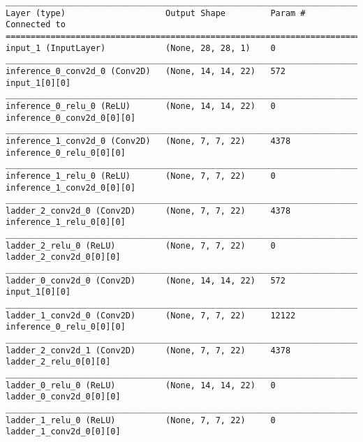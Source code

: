 \begin{lstlisting}[caption={\ac{VLAE} network encoder used for network sparsity experiments with one third the number of feature maps},captionpos=b,basicstyle=\tiny, label={lst:sparsity-vlae-encoder-28-fm3}]
__________________________________________________________________________________________________
Layer (type)                    Output Shape         Param #     Connected to
==================================================================================================
input_1 (InputLayer)            (None, 28, 28, 1)    0
__________________________________________________________________________________________________
inference_0_conv2d_0 (Conv2D)   (None, 14, 14, 22)   572         input_1[0][0]
__________________________________________________________________________________________________
inference_0_relu_0 (ReLU)       (None, 14, 14, 22)   0           inference_0_conv2d_0[0][0]
__________________________________________________________________________________________________
inference_1_conv2d_0 (Conv2D)   (None, 7, 7, 22)     4378        inference_0_relu_0[0][0]
__________________________________________________________________________________________________
inference_1_relu_0 (ReLU)       (None, 7, 7, 22)     0           inference_1_conv2d_0[0][0]
__________________________________________________________________________________________________
ladder_2_conv2d_0 (Conv2D)      (None, 7, 7, 22)     4378        inference_1_relu_0[0][0]
__________________________________________________________________________________________________
ladder_2_relu_0 (ReLU)          (None, 7, 7, 22)     0           ladder_2_conv2d_0[0][0]
__________________________________________________________________________________________________
ladder_0_conv2d_0 (Conv2D)      (None, 14, 14, 22)   572         input_1[0][0]
__________________________________________________________________________________________________
ladder_1_conv2d_0 (Conv2D)      (None, 7, 7, 22)     12122       inference_0_relu_0[0][0]
__________________________________________________________________________________________________
ladder_2_conv2d_1 (Conv2D)      (None, 7, 7, 22)     4378        ladder_2_relu_0[0][0]
__________________________________________________________________________________________________
ladder_0_relu_0 (ReLU)          (None, 14, 14, 22)   0           ladder_0_conv2d_0[0][0]
__________________________________________________________________________________________________
ladder_1_relu_0 (ReLU)          (None, 7, 7, 22)     0           ladder_1_conv2d_0[0][0]

\end{lstlisting}
